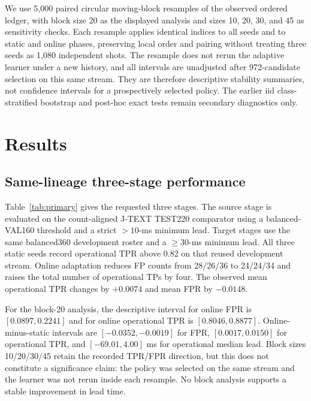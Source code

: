 \documentclass[10pt,twocolumn]{article}
\newcommand{\jtext}{J-TEXT}
\newcommand{\east}{EAST}
\begin{document}
We use 5,000 paired circular moving-block resamples of the observed ordered ledger, with block size 20 as the displayed analysis and sizes 10, 20, 30, and 45 as sensitivity checks.  Each resample applies identical indices to all seeds and to static and online phases, preserving local order and pairing without treating three seeds as 1,080 independent shots.  The resample does not rerun the adaptive learner under a new history, and all intervals are unadjusted after 972-candidate selection on this same stream.  They are therefore descriptive stability summaries, not confidence intervals for a prospectively selected policy.  The earlier iid class-stratified bootstrap and post-hoc exact tests remain secondary diagnostics only.

\section{Results}

\subsection{Same-lineage three-stage performance}

Table~\ref{tab:primary} gives the requested three stages.  The source stage is evaluated on the count-aligned \jtext{} TEST220 comparator using a balanced-VAL160 threshold and a strict $>10$-ms minimum lead.  Target stages use the same balanced360 development roster and a $\geq30$-ms minimum lead.  All three static seeds record operational TPR above 0.82 on that reused development stream.  Online adaptation reduces FP counts from 28/26/36 to 24/24/34 and raises the total number of operational TPs by four.  The observed mean operational TPR changes by $+0.0074$ and mean FPR by $-0.0148$.

\begin{table}[t]
\centering
\caption{Primary same-lineage operational metrics.  A \jtext{} TP requires lead $>10$ ms and an \east{} TP requires lead $\geq30$ ms.  Median lead is over lead-qualified TPs only.  A single causal supported crossing is sufficient; the mean rows are arithmetic summaries, not confidence bounds.}
\label{tab:primary}
\scriptsize

\end{table}

For the block-20 analysis, the descriptive interval for online FPR is $[0.0897,0.2241]$ and for online operational TPR is $[0.8046,0.8877]$.  Online-minus-static intervals are $[-0.0352,-0.0019]$ for FPR, $[0.0017,0.0150]$ for operational TPR, and $[-69.01,4.00]$ ms for operational median lead.  Block sizes 10/20/30/45 retain the recorded TPR/FPR direction, but this does not constitute a significance claim: the policy was selected on the same stream and the learner was not rerun inside each resample.  No block analysis supports a stable improvement in lead time.
\end{document}
